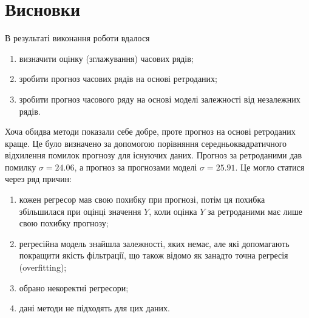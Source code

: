 \chapter*{Висновки}

В результаті виконання роботи вдалося
\begin{enumerate}
  \item визначити оцінку (зглажування) часових рядів;
  \item зробити прогноз часових рядів на основі ретроданих;
  \item зробити прогноз часового ряду на основі моделі залежності
    від незалежних рядів.
\end{enumerate}

Хоча обидва методи показали себе добре,
проте прогноз на основі ретроданих краще.
Це було визначено за допомогою порівняння середньоквадратичного відхилення
помилок прогнозу для існуючих даних.
Прогноз за ретроданими дав помилку $\sigma = 24.06$,
а прогноз за прогнозами моделі $\sigma = 25.91$.
Це могло статися через ряд причин:
\begin{enumerate}
  \item кожен регресор мав свою похибку при прогнозі,
    потім ця похибка збільшилася при оцінці значення $Y$,
    коли оцінка $Y$ за ретроданими має лише свою похибку прогнозу;
  \item регресійна модель знайшла залежності, яких немає,
    але які допомагають покращити якість фільтрації,
    що також відомо як занадто точна регресія (overfitting);
    \cite{overfitting}
  \item обрано некоректні регресори;
  \item дані методи не підходять для цих даних.
\end{enumerate}

\begin{center}
\end{center}
